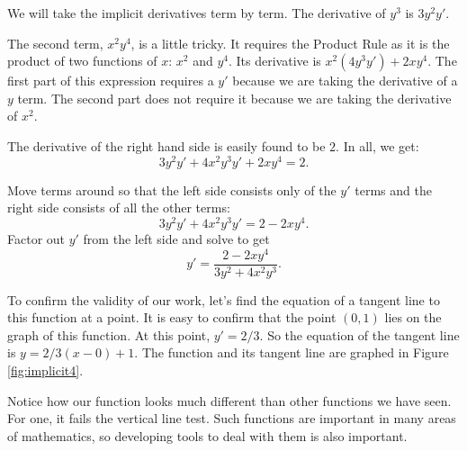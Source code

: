 {We will take the implicit derivatives term by term. The derivative of $y^3$ is $3y^2y'$.  

The second term, $x^2y^4$, is a little tricky.  It requires the Product Rule as it is the product of two functions of $x$: $x^2$ and $y^4$.  Its derivative is $x^2(4y^3y') + 2xy^4$.  The first part of this expression requires a $y'$ because we are taking the derivative of a $y$ term.  The second part does not require it because we are taking the derivative of $x^2$.  

The derivative of the right hand side is easily found to be $2$. In all, we get:
$$3y^2y' + 4x^2y^3y' + 2xy^4 = 2.$$

Move terms around so that the left side consists only of the $y'$ terms and the right side consists of all the other terms:
$$3y^2y' + 4x^2y^3y' = 2-2xy^4.$$
Factor out $y'$ from the left side and solve to get
$$y' = \frac{2-2xy^4}{3y^2+4x^2y^3}.$$

To confirm the validity of our work, let's find the equation of a tangent line to this function at a point. It is easy to confirm that the point $(0,1)$ lies on the graph of this function. At this point, $y' = 2/3$. So the equation of the tangent line is $y = 2/3(x-0)+1$. The function and its tangent line are graphed in Figure \ref{fig:implicit4}.


Notice how our function looks much different than other functions we have seen. For one, it fails the vertical line test. Such functions are important in many areas of mathematics, so developing tools to deal with them is also important.
}\\

